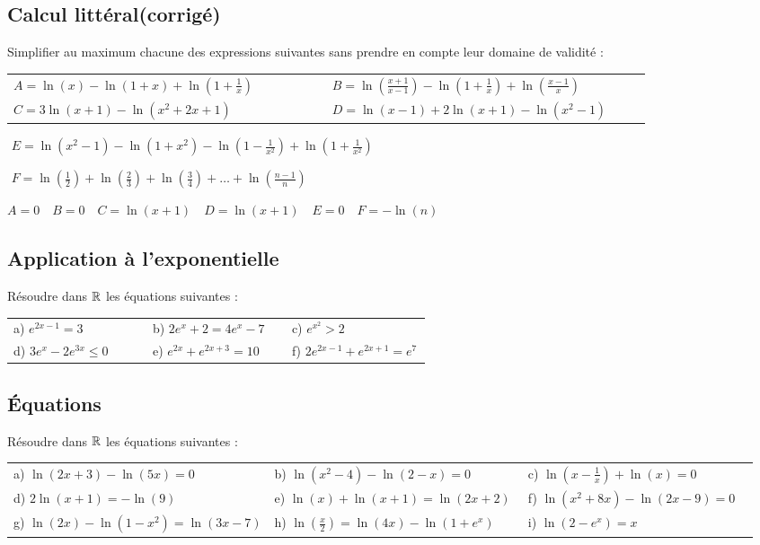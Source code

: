 \documentclass[oneside,12pt]{book}          %
\begin{document}
\subsection{Calcul littéral\quad\small{(corrigé)}}
Simplifier au maximum chacune des expressions suivantes sans prendre en compte leur domaine de validité :

\begin{tabular}{p{0.45\linewidth}p{0.45\linewidth}}
	$A=\ln(x)-\ln(1+x)+\ln(1+\frac{1}{x})$ & $B=\ln\left(\frac{x+1}{x-1}\right)-\ln\left(1+\frac{1}{x}\right)+\ln\left(\frac{x-1}{x}\right)$ \\
	$C=3\ln(x+1)-\ln\left(x^2+2x+1\right)$ & $D=\ln(x-1)+2\ln(x+1)-\ln(x^2-1)$
\end{tabular}

\,\,$E=\ln(x^2-1)-\ln(1+x^2)-\ln\left(1-\frac{1}{x^2}\right)+\ln\left(1+\frac{1}{x^2}\right)$

\,\,$F=\ln\left(\frac{1}{2}\right)+\ln\left(\frac{2}{3} \right)+\ln\left(\frac{3}{4}\right)+\ldots+\ln\left( \frac{n-1}{n}\right)$

\begin{sol}
	$A=0 \quad B=0 \quad C=\ln(x+1) \quad D=\ln(x+1) \quad E=0 \quad F=-\ln(n)$
\end{sol}



\subsection{Application à l'exponentielle}
Résoudre dans ${\mathbb R}$ les équations suivantes :\\
\renewcommand{\arraystretch}{1.6}
\begin{tabular}{p{0.33\linewidth} p{0.33\linewidth} p{0.33\linewidth}}
a) $e^{2x-1} = 3$ & b) $2e^x + 2 = 4e^x-7$ & c) $e^{x^2} > 2$ \\
d) $3e^x - 2e^{3x} \leq 0$ & e) $e^{2x} + e^{2x+3} = 10$ & f) $2e^{2x-1} + e^{2x+1} = e^7$ \\
\end{tabular}



\subsection{Équations}
Résoudre dans ${\mathbb R}$ les équations suivantes :\\
\renewcommand{\arraystretch}{1.6}
\begin{tabular}{p{0.35\linewidth} p{0.34\linewidth} p{0.32\linewidth}}
a) $\ln\left(2x+3\right) - \ln\left(5x\right) = 0$ & b) $\ln\left(x^2-4\right) - \ln\left(2-x\right) = 0$ & c) $\ln\left(x-\frac{1}{x}\right) + \ln\left(x\right) = 0$ \\
d) $2\ln\left(x+1\right) = -\ln(9)$ & e) $\ln\left(x\right) + \ln\left(x+1\right) = \ln\left(2x+2\right)$ &
f) $\ln\left(x^2 + 8x\right) - \ln\left(2x-9\right) = 0$ \\
g) $\ln\left(2x\right) - \ln\left(1-x^2\right) = \ln\left(3x-7\right)$ & h) $\ln\left(\frac{x}{2}\right) = \ln\left(4x\right) - \ln\left(1+e^x\right)$ & i) $\ln\left(2-e^x\right) = x$ \\
\end{tabular}
\end{document}
